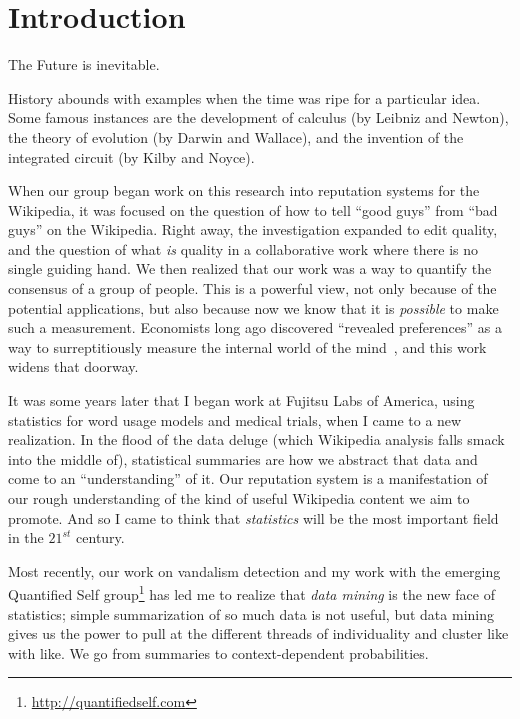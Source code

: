 \section{Introduction}

The Future is inevitable.

History abounds with examples when the time was ripe for a particular idea.
Some famous instances are the development of calculus (by Leibniz and Newton),
the theory of evolution (by Darwin and Wallace), and the invention of
the integrated circuit (by Kilby and Noyce).

When our group began work on this research into reputation systems for
the Wikipedia, it was focused on the
question of how to tell ``good guys'' from ``bad guys'' on the Wikipedia.
Right away, the investigation expanded to edit quality, and the question of what
\textit{is} quality in a collaborative work where there is no single
guiding hand.
We then realized that our work was a
way to quantify the consensus of a group of people.
This is a powerful view, not only because of the potential
applications, but also because now we know that it is \textit{possible}
to make such a measurement.
Economists long ago discovered ``revealed preferences''
as a way to surreptitiously measure the internal world of the
mind~\cite{Samuelson1938,Varian2006}, and this work widens that doorway.

It was some years later that I began work at Fujitsu Labs of America,
using statistics for word usage models and medical trials,
when I came to a new realization.
In the flood of the data deluge (which Wikipedia analysis falls smack
into the middle of), statistical summaries are how we abstract that data
and come to an ``understanding'' of it.
Our reputation system is a manifestation of our
rough understanding of the kind of useful Wikipedia content we aim to
promote.
And so I came to think that \textit{statistics} will be the
most important field in the $21^{st}$ century.

Most recently, our work on vandalism detection and my work with the
emerging Quantified Self group\footnote{\url{http://quantifiedself.com}}
has led me to realize that
\textit{data mining} is the new face of statistics; simple summarization
of so much data is not useful, but data mining gives us the power to
pull at the different threads of individuality and cluster like with like.
We go from summaries to context-dependent probabilities.

